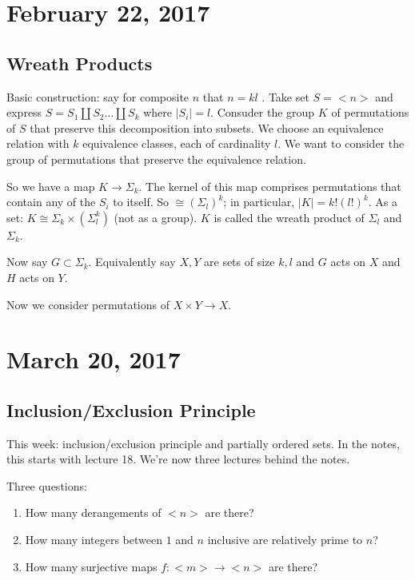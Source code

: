 \documentclass[12pt]{article}
\theoremstyle{definition}
\begin{document}
\section{February 22, 2017}

\subsection{Wreath Products}

Basic construction: say for composite $n$ that $n = kl$ . Take set $S = <n>$
 and express $S = S_1 \coprod S_2 \ldots \coprod S_k$ where $|S_i| = l$.
Consuder the group $K$ of permutations of $S$ that preserve this decomposition
into subsets. We choose an equivalence relation with $k$ equivalence classes,
each of cardinality $l$. We want to consider the group of permutations that
preserve the equivalence relation. 

So we have a map $K \rightarrow \Sigma_k$. The kernel of this map comprises
permutations that contain any of the $S_i$ to itself. So $\cong (\Sigma_l)^k$;
in particular, $|K| = k!(l!)^k$. As a set: $K \cong \Sigma_k \times
(\Sigma_l^k)$ (not as a group). $K$ is called the wreath product of $\Sigma_l$
and $\Sigma_k$.

Now say $G \subset \Sigma_k$. Equivalently say $X, Y$ are sets of size $k, l$
and $G$ acts on $X$ and $H$ acts on $Y$.

Now we consider permutations of $X \times Y \rightarrow X$.

\section{March 20, 2017}

\subsection{Inclusion/Exclusion Principle}

This week: inclusion/exclusion principle and partially ordered sets. In the
notes, this starts with lecture 18. We're now three lectures behind the notes.

Three questions:
\begin{enumerate}
    \item
        How many derangements of $< n >$ are there?
    \item
        How many integers between $1$ and $n$ inclusive are relatively prime to
        $n$?
    \item
        How many surjective maps $f: <m> \rightarrow <n>$ are there?
\end{enumerate}
\end{document}
